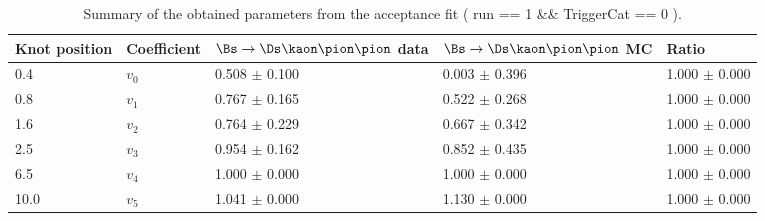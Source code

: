 \begin{table}[h]
\centering
\caption{Summary of the obtained parameters from the acceptance fit ( run == 1 && TriggerCat == 0 ).} 
\begin{tabular}{l l l l l}
\hline
\hline
Knot position & Coefficient & $\Bs\to\Ds\kaon\pion\pion$ data & $\Bs\to\Ds\kaon\pion\pion$ MC & Ratio \\
\hline
0.4 & $v_{0}$ & 0.508 $\pm$ 0.100 & 0.003 $\pm$ 0.396 & 1.000 $\pm$ 0.000\\
0.8 & $v_{1}$ & 0.767 $\pm$ 0.165 & 0.522 $\pm$ 0.268 & 1.000 $\pm$ 0.000\\
1.6 & $v_{2}$ & 0.764 $\pm$ 0.229 & 0.667 $\pm$ 0.342 & 1.000 $\pm$ 0.000\\
2.5 & $v_{3}$ & 0.954 $\pm$ 0.162 & 0.852 $\pm$ 0.435 & 1.000 $\pm$ 0.000\\
6.5 & $v_{4}$ & 1.000 $\pm$ 0.000 & 1.000 $\pm$ 0.000 & 1.000 $\pm$ 0.000\\
10.0 & $v_{5}$ & 1.041 $\pm$ 0.000 & 1.130 $\pm$ 0.000 & 1.000 $\pm$ 0.000\\
\hline
\hline
\end{tabular}
\label{table:splines}
\end{table}
